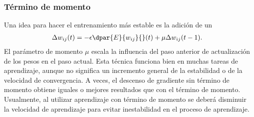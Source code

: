 \subsubsection{Término de momento}
%
Una idea para hacer el entrenamiento más estable es la adición de un
%
\begin{align}\label{mlp8}
  \Delta w_{ij}(t) = - \epsilon \dpar{E}{w_{ij}}{}(t)
    + \mu \Delta w_{ij}(t-1).
\end{align}
%
El parámetro de momento $\mu$ escala la influencia del paso anterior
de actualización de los pesos en el paso actual. Esta técnica funciona
bien en muchas tareas de aprendizaje, aunque no significa un
incremento general de la estabilidad o de la velocidad de
convergencia.  A veces, el descenso de gradiente sin término de
momento obtiene iguales o mejores resultados que con el término de
momento. Usualmente, al utilizar aprendizaje con término de momento se
deberá disminuir la velocidad de aprendizaje para evitar inestabilidad
en el proceso de aprendizaje.

